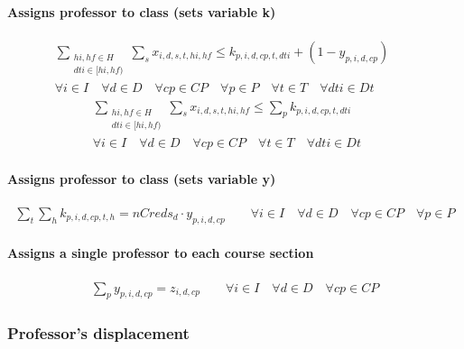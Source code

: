\paragraph{Assigns professor to class (sets variable k)}
\begin{eqnarray}
\sum_{ \substack {hi,hf \in H \\ dti \in [hi,hf)} } \sum\limits_{s} x_{i,d,s,t,hi,hf} \le k_{p,i,d,cp,t,dti} + ( 1 - y_{p,i,d,cp} ) \nonumber \qquad
\\
\forall i \in I \quad
\forall d \in D \quad
\forall cp \in CP \quad
\forall p \in P \quad
\forall t \in T \quad
\forall dti \in Dt
\end{eqnarray}
\begin{eqnarray}
\sum_{ \substack {hi,hf \in H \\ dti \in [hi,hf)} } \sum\limits_{s} x_{i,d,s,t,hi,hf} \le \sum\limits_{p} k_{p,i,d,cp,t,dti} \nonumber \qquad
\\
\forall i \in I \quad
\forall d \in D \quad
\forall cp \in CP \quad
\forall t \in T \quad
\forall dti \in Dt
\end{eqnarray}
	
\paragraph{Assigns professor to class (sets variable y)}
\begin{eqnarray}
\sum\limits_{t} \sum\limits_{h} k_{p,i,d,cp,t,h} = nCreds_{d} \cdot y_{p,i,d,cp} \nonumber \qquad
\forall i \in I \quad
\forall d \in D \quad
\forall cp \in CP \quad
\forall p \in P
\end{eqnarray}	
	
\paragraph{Assigns a single professor to each course section}
\begin{eqnarray}
\sum\limits_{p} y_{p,i,d,cp} = z_{i,d,cp} \nonumber \qquad
\forall i \in I \quad
\forall d \in D \quad
\forall cp \in CP
\end{eqnarray}	


\subsubsection{Professor's displacement}
\label{constrProfessorDisplac}

